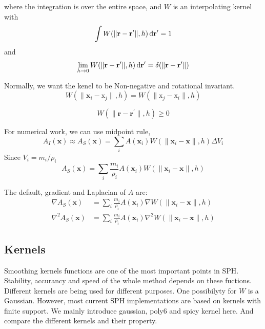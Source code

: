     where the integration is over the entire space, and $W$ is an interpolating kernel with 
    \begin{equation}
        \int W(\|\textbf{r} - \textbf{r}^{\prime}\|, h)\,\mathrm{d} \textbf{r}^{\prime} = 1
    \end{equation}
    and
    \begin{equation}
        \lim_{h\to 0} W(\|\textbf{r} - \textbf{r}^{\prime}\|, h)\,\mathrm{d}\textbf{r}^{\prime} = \delta(\|\textbf{r} - \textbf{r}^{\prime}\|) 
    \end{equation}

    Normally, we want the kenel to be Non-negative and rotational invariant.
    \begin{equation}
        W(\|\textbf{x}_{i} - \text{x}_{j}\|, h) = W(\|\text{x}_{j} - \text{x}_{i}\|, h)
    \end{equation}

    \begin{equation}
        W(\|\textbf{r} - \textbf{r}^{\prime}\|, h) \ge 0
    \end{equation}

    For numerical work, we can use midpoint rule,
    \begin{equation}
        A_{I}(\textbf{x}) \approx A_{S}(\textbf{x}) = \sum_{i} A(\textbf{x}_{i})W(\|\textbf{x}_{i}-\textbf{x}\|, h)\Delta V_{i}
    \end{equation}
    Since $V_{i} = m_{i}/\rho _{i}$
    \begin{equation}
        A_{S}(\textbf{x}) = \sum_{i} \frac{m_{i}}{\rho_{i}} A(\textbf{x}_{i})W(\|\textbf{x}_{i}-\textbf{x}\|, h)
    \end{equation}

    The default, gradient and Laplacian of $A$ are:
    \begin{equation}
        \begin{aligned}
            \nabla A_{S}(\textbf{x}) &= \sum_{i} \frac{m_{i}}{\rho_{i}} A(\textbf{x}_{i})\nabla W(\|\textbf{x}_{i}-\textbf{x}\|, h) \\
            \nabla^{2} A_{S}(\textbf{x}) &= \sum_{i} \frac{m_{i}}{\rho_{i}} A(\textbf{x}_{i})\nabla^{2} W(\|\textbf{x}_{i}-\textbf{x}\|, h)
        \end{aligned}
        \label{eq:1}
    \end{equation}

    \subsection{Kernels}
    \label{sec:kernels}
    Smoothing kernels functions are one of the most important points in SPH. Stability, accurancy and speed of the whole method depends on these fuctions. Different kernels are being used for different purposes. One possibilyty for $W$ is a Gaussian. However, most current SPH implementations are based on kernels with finite support. We mainly introduce gaussian, poly6 and spicy kernel here. And compare the different kernels and their property.

